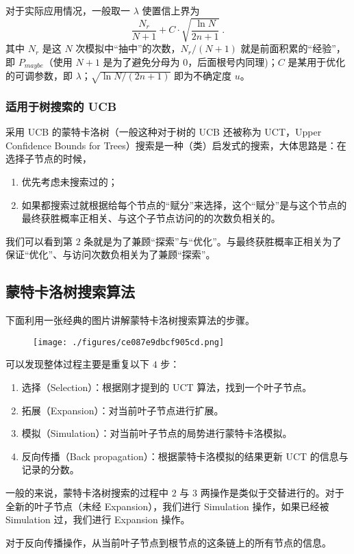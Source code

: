 对于实际应用情况，一般取一 $\lambda$ 使置信上界为
$$\frac{N_r}{N+1} + C \cdot \sqrt{\frac{\ln N}{2n+1}} ~.$$
其中 $N_r$ 是这 $N$ 次模拟中“抽中”的次数，$N_r/(N+1)$ 就是前面积累的“经验”，即 $P_{maybe}$（使用 $N+1$ 是为了避免分母为 $0$，后面根号内同理)；$C$ 是某用于优化的可调参数，即 $\lambda$；$\sqrt{\ln N/(2n+1)}$ 即为不确定度 $u$。

\subsubsection{适用于树搜索的 UCB}
采用 UCB 的蒙特卡洛树（一般这种对于树的 UCB 还被称为 UCT，Upper Confidence Bounds for Trees）搜索是一种（类）启发式的搜索，大体思路是：在选择子节点的时候，
\begin{enumerate}
\item 优先考虑未搜索过的；
\item 如果都搜索过就根据给每个节点的“赋分”来选择，这个“赋分”是与这个节点的最终获胜概率正相关、与这个子节点访问的的次数负相关的。
\end{enumerate}
我们可以看到第 $2$ 条就是为了兼顾“探索”与“优化”。与最终获胜概率正相关为了保证“优化”、与访问次数负相关为了兼顾“探索”。

\subsection{蒙特卡洛树搜索算法}
下面利用一张经典的图片讲解蒙特卡洛树搜索算法的步骤。
\begin{figure}[ht]
\centering
\texttt{[image: ./figures/ce087e9dbcf905cd.png]}
\caption{} \label{fig_MCTS_1}
\end{figure}
可以发现整体过程主要是重复以下 $4$ 步：
\begin{enumerate}
\item 选择（Selection）：根据刚才提到的 UCT 算法，找到一个叶子节点。
\item 拓展（Expansion）：对当前叶子节点进行扩展。
\item 模拟（Simulation）：对当前叶子节点的局势进行蒙特卡洛模拟。
\item 反向传播（Back propagation）：根据蒙特卡洛模拟的结果更新 UCT 的信息与记录的分数。
\end{enumerate}
一般的来说，蒙特卡洛树搜索的过程中 $2$ 与 $3$ 两操作是类似于交替进行的。对于全新的叶子节点（未经 Expansion），我们进行 Simulation 操作，如果已经被 Simulation 过，我们进行 Expansion 操作。

对于反向传播操作，从当前叶子节点到根节点的这条链上的所有节点的信息。

